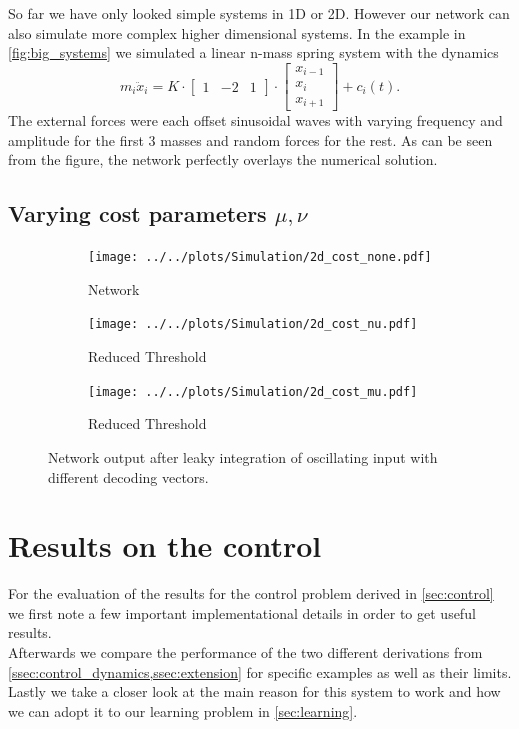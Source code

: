 So far we have only looked simple systems in 1D or 2D. However our network can also simulate more complex higher dimensional systems.
In the example in \cref{fig:big_systems} we simulated a linear n-mass spring system with the dynamics
\begin{equation}
	m_i\ddot{x}_i = K\cdot \begin{bmatrix}
	1&-2&1
	\end{bmatrix} \cdot	\begin{bmatrix}
	x_{i-1}\\
	x_i\\
	x_{i+1}
	\end{bmatrix} + c_i(t).
\end{equation}
The external forces were each offset sinusoidal waves with varying frequency and amplitude for the first 3 masses and random forces for the rest. As can be seen from the figure, the network perfectly overlays the numerical solution.


\subsection{Varying cost parameters $\mu,\nu$}
\begin{figure}[h!]
	\centering
	\begin{subfigure}[t]{0.6\textwidth}
		\centering
		\texttt{[image: ../../plots/Simulation/2d\_cost\_none.pdf]}
		\caption{Network }
		\label{fig:sim_no_cost}
	\end{subfigure}
	\hfill
	\begin{subfigure}[t]{0.6\textwidth}
		\centering
		\texttt{[image: ../../plots/Simulation/2d\_cost\_nu.pdf]}
		\caption{Reduced Threshold}
		\label{fig:sim_nu_cost}
	\end{subfigure}
	\hfill
	\begin{subfigure}[t]{0.6\textwidth}
		\centering
		\texttt{[image: ../../plots/Simulation/2d\_cost\_mu.pdf]}
		\caption{Reduced Threshold}
		\label{fig:sim_mu_cost}
	\end{subfigure}
	\caption{Network output after leaky integration of oscillating input with different decoding vectors.}
	\label{fig:sim_res_4}
\end{figure}

\section{Results on the control}
For the evaluation of the results for the control problem derived in \cref{sec:control} we first note a few important implementational details in order to get useful results. \\
Afterwards we compare the performance of the two different derivations from \cref{ssec:control_dynamics,ssec:extension} for specific examples as well as their limits.
Lastly we take a closer look at the main reason for this system to work and how we can adopt it to our learning problem in \cref{sec:learning}.
